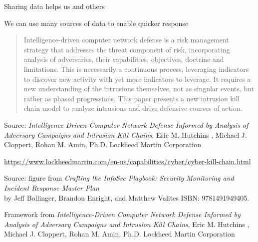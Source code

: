 \documentclass[Screen16to9,17pt]{foils}
\begin{document}
\begin{list2}
\item Sharing data helps us and others
\item We can use many sources of data to enable quicker response
\end{list2}



\begin{quote}
Intelligence-driven computer network defense is a risk management strategy that addresses the threat
component of risk, incorporating analysis of adversaries, their capabilities, objectives, doctrine and limitations. This is necessarily a continuous process, leveraging indicators to discover new activity with yet more indicators to leverage. It requires a new understanding of the intrusions themselves, not as singular events, but rather as phased progressions. This paper presents a new intrusion kill chain model to analyze intrusions and drive defensive courses of action.

\end{quote}
Source: \emph{Intelligence-Driven Computer Network Defense Informed by Analysis of Adversary Campaigns and Intrusion Kill Chains}, Eric M. Hutchins , Michael J. Cloppert, Rohan M. Amin, Ph.D. Lockheed Martin Corporation\\{\footnotesize
 }

\url{https://www.lockheedmartin.com/en-us/capabilities/cyber/cyber-kill-chain.html}




\begin{list2}
\item  Source: figure from \emph{Crafting the InfoSec Playbook: Security Monitoring and Incident Response Master Plan}\\ by Jeff Bollinger, Brandon Enright, and Matthew Valites ISBN: 9781491949405.
\item Framework from \emph{Intelligence-Driven Computer Network Defense Informed by Analysis of Adversary Campaigns and Intrusion Kill Chains}, Eric M. Hutchins , Michael J. Cloppert, Rohan M. Amin, Ph.D. Lockheed Martin Corporation\\{\footnotesize
 }
\end{list2}
\end{document}
